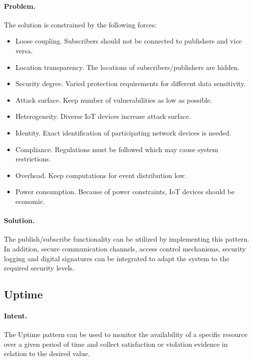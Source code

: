 \paragraph{\textbf{Problem.}} The solution is constrained by the following forces:
\begin{itemize}
	\item Loose coupling. Subscribers should not be connected to publishers and vice versa.
	\item Location transparency. The locations of subscribers/publishers are hidden.
	\item Security degree. Varied protection requirements for different data sensitivity.
	\item Attack surface. Keep number of vulnerabilities as low as possible.
	\item Heterogeneity. Diverse IoT devices increase attack surface. 
	\item Identity. Exact identification of participating network devices is needed.
	\item Compliance. Regulations must be followed which may cause system restrictions.
	\item Overhead. Keep computations for event distribution low.
	\item Power consumption. Because of power constraints, IoT devices should be economic.
\end{itemize}

\paragraph{\textbf{Solution.}} The publish/subscribe functionality can be utilized by implementing this pattern. In addition, secure communication channels, access control mechanisms, security logging and digital signatures can be integrated to adapt the system to the required security levels.


\subsection{Uptime ~\cite{Papoutsakis2021}} 
\label{p:uptime}

\paragraph{\textbf{Intent.}} The Uptime pattern can be used to monitor the availability of a specific resource over a given period of time and collect satisfaction or violation evidence in relation to the desired value.


